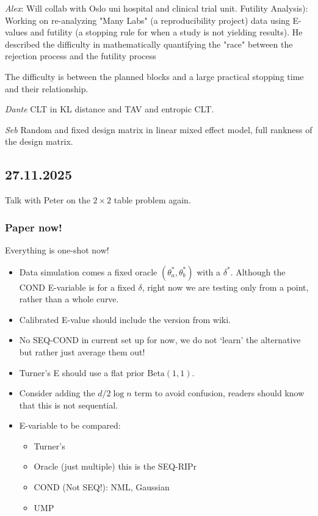 \emph{Alex}: Will collab with Oslo uni hospital and clinical trial unit. Futility Analysis): Working on re-analyzing "Many Labs" (a reproducibility project) data using E-values and futility (a stopping rule for when a study is not yielding results). He described the difficulty in mathematically quantifying the "race" between the rejection process and the futility process

The difficulty is between the planned blocks and a large practical stopping time and their relationship.

\emph{Dante} CLT in KL distance and TAV and entropic CLT.

\emph{Seb} Random and fixed design matrix in linear mixed effect model, full rankness of the design matrix.

\subsection*{27.11.2025}

Talk with Peter on the $2\times 2$ table problem again.

\subsubsection*{Paper now!} Everything is one-shot now!

\begin{itemize}
	\item Data simulation comes a fixed oracle $(\theta_a^*, \theta_b^*)$ with a $\delta^*$.
	      Although the COND E-variable is for a fixed $\delta$, right now we are testing only from a point, rather than a whole curve.
	\item Calibrated E-value should include the version from wiki.
	\item No SEQ-COND in current set up for now, we do not `learn' the alternative but rather just average them out!
	\item Turner's E should use a flat prior $\mathrm{Beta}(1,1)$.
	\item Consider adding the $d/2\log n$ term to avoid confusion, readers should know that this is not sequential.
	\item E-variable to be compared:
	      \begin{itemize}
		      \item Turner's
		      \item Oracle (just multiple) this is the SEQ-RIPr
		      \item COND (Not SEQ!): NML, Gaussian
		      \item UMP
	      \end{itemize}
\end{itemize}

